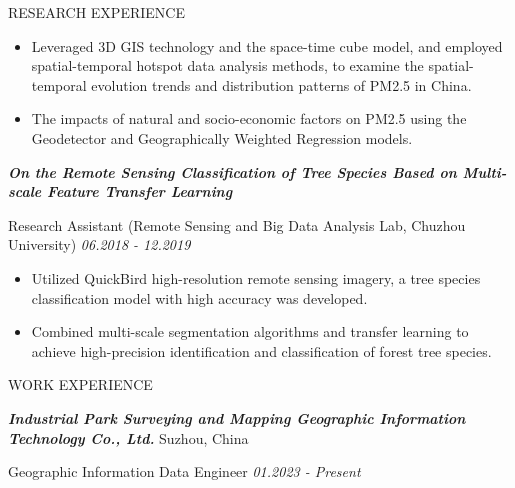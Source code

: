\documentclass{resume}
\begin{document}
\begin{ResumeSection}{RESEARCH EXPERIENCE}
    \begin{itemize}
    
        \item Leveraged 3D GIS technology and the space-time cube model, and employed spatial-temporal hotspot data analysis methods, to examine the spatial-temporal evolution trends and distribution patterns of PM2.5 in China. 
    \end{itemize}

    \begin{itemize}
    
        \item The impacts of natural and socio-economic factors on PM2.5 using the Geodetector and Geographically Weighted Regression models.
    \end{itemize}

\textit{\textbf{On the Remote Sensing Classification of Tree Species Based on Multi-scale Feature Transfer Learning} }

Research Assistant (Remote Sensing and Big Data Analysis Lab, Chuzhou University)	 \hfill{\textit{06.2018 - 12.2019}} 

    \begin{itemize}
    
        \item Utilized QuickBird high-resolution remote sensing imagery, a tree species classification model with high accuracy was developed.

    \end{itemize}

    \begin{itemize}
    
        \item Combined multi-scale segmentation algorithms and transfer learning to achieve high-precision identification and classification of forest tree species.

    \end{itemize}



\vspace{1mm}  
\begin{ResumeSection}{WORK EXPERIENCE}

\textbf{\textit{Industrial Park Surveying and Mapping Geographic Information Technology Co., Ltd. }}\hfill{Suzhou, China}

{Geographic Information Data Engineer }
\hfill{\textit{01.2023 - Present}} 
    \begin{itemize}
    

\end{itemize}
\end{ResumeSection}
\end{ResumeSection}
\end{document}
